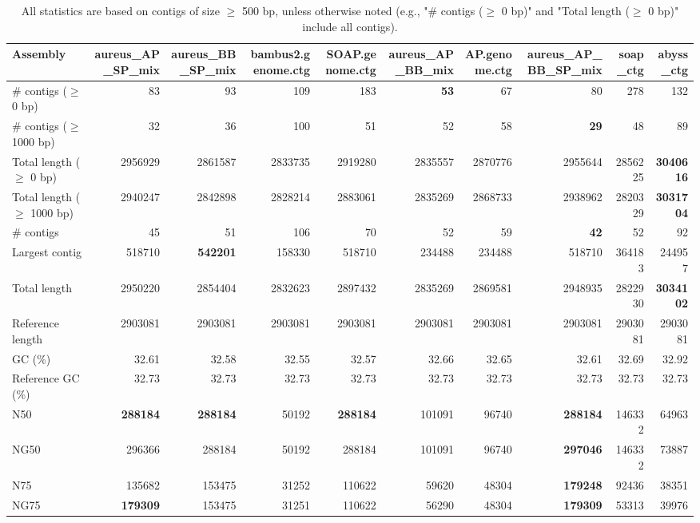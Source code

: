 \documentclass[12pt,a4paper]{article}
\begin{document}
\begin{table}[ht]
\begin{center}
\caption{All statistics are based on contigs of size $\geq$ 500 bp, unless otherwise noted (e.g., "\# contigs ($\geq$ 0 bp)" and "Total length ($\geq$ 0 bp)" include all contigs).}
\begin{tabular}{|l*{9}{|r}|}
\hline
Assembly & aureus\_AP\_SP\_mix & aureus\_BB\_SP\_mix & bambus2.genome.ctg & SOAP.genome.ctg & aureus\_AP\_BB\_mix & AP.genome.ctg & aureus\_AP\_BB\_SP\_mix & soap\_ctg & abyss\_ctg \\ \hline
\# contigs ($\geq$ 0 bp) & 83 & 93 & 109 & 183 & {\bf 53} & 67 & 80 & 278 & 132 \\ \hline
\# contigs ($\geq$ 1000 bp) & 32 & 36 & 100 & 51 & 52 & 58 & {\bf 29} & 48 & 89 \\ \hline
Total length ($\geq$ 0 bp) & 2956929 & 2861587 & 2833735 & 2919280 & 2835557 & 2870776 & 2955644 & 2856225 & {\bf 3040616} \\ \hline
Total length ($\geq$ 1000 bp) & 2940247 & 2842898 & 2828214 & 2883061 & 2835269 & 2868733 & 2938962 & 2820329 & {\bf 3031704} \\ \hline
\# contigs & 45 & 51 & 106 & 70 & 52 & 59 & {\bf 42} & 52 & 92 \\ \hline
Largest contig & 518710 & {\bf 542201} & 158330 & 518710 & 234488 & 234488 & 518710 & 364183 & 244957 \\ \hline
Total length & 2950220 & 2854404 & 2832623 & 2897432 & 2835269 & 2869581 & 2948935 & 2822930 & {\bf 3034102} \\ \hline
Reference length & 2903081 & 2903081 & 2903081 & 2903081 & 2903081 & 2903081 & 2903081 & 2903081 & 2903081 \\ \hline
GC (\%) & 32.61 & 32.58 & 32.55 & 32.57 & 32.66 & 32.65 & 32.61 & 32.69 & 32.92 \\ \hline
Reference GC (\%) & 32.73 & 32.73 & 32.73 & 32.73 & 32.73 & 32.73 & 32.73 & 32.73 & 32.73 \\ \hline
N50 & {\bf 288184} & {\bf 288184} & 50192 & {\bf 288184} & 101091 & 96740 & {\bf 288184} & 146332 & 64963 \\ \hline
NG50 & 296366 & 288184 & 50192 & 288184 & 101091 & 96740 & {\bf 297046} & 146332 & 73887 \\ \hline
N75 & 135682 & 153475 & 31252 & 110622 & 59620 & 48304 & {\bf 179248} & 92436 & 38351 \\ \hline
NG75 & {\bf 179309} & 153475 & 31251 & 110622 & 56290 & 48304 & {\bf 179309} & 53313 & 39976 \\ \hline

\end{tabular}
\end{center}
\end{table}
\end{document}
